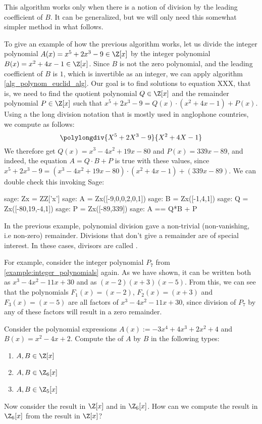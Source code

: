This algorithm works only when there is a notion of division by the leading coefficient of $B$. It can be generalized, but we will only need this somewhat simpler method in what follows.
\begin{example} To give an example of how the previous algorithm works, let us divide the integer polynomial $A(x)=x^5+2x^3-9\in \Z[x]$ by the integer polynomial $B(x)=x^2+4x-1\in\Z[x]$. Since $B$ is not the zero polynomial, and the leading coefficient of $B$ is $1$, which is invertible as an integer, we can apply algorithm \ref{alg_polynom_euclid_alg}. Our goal is to find solutions to equation XXX, that is, we need to find the quotient polynomial $Q\in\Z[x]$ and the remainder polynomial $P \in \Z[x]$ such that $x^5+2x^3-9 = Q(x)\cdot (x^2+4x-1) + P(x)$. Using a the long division notation that is mostly used in anglophone countries, we compute as follows:
\begin{equation}
\polylongdiv{X^5+2X^3-9}{X^2+4X-1}
\end{equation}
We therefore get $Q(x)=x^3-4x^2+19x-80$ and $P(x)=339x-89$, and indeed, the equation $ A=  Q \cdot B + P$ is true with these values, since $x^5+2x^3-9 = (x^3-4x^2+19x-80)\cdot (x^2+4x-1) + (339x-89)$. We can double check this invoking  Sage:
\begin{sagecommandline}
sage: Zx = ZZ['x']
sage: A = Zx([-9,0,0,2,0,1])
sage: B = Zx([-1,4,1])
sage: Q = Zx([-80,19,-4,1])
sage: P = Zx([-89,339])
sage: A == Q*B + P
\end{sagecommandline}
\end{example}
\begin{example} In the previous example, polynomial division gave a non-trivial (non-vanishing, i.e non-zero) remainder. Divisions that don't give a remainder are of special interest. In these cases, divisors are called .

For example, consider the integer polynomial $P_7$ from \examplename{} \ref{example:integer_polynomials} again. As we have shown, it can be written both as $x^3 - 4 x^2 - 11 x + 30$ and as $(x-2)(x + 3)(x-5)$. From this, we can see that the polynomials $F_1(x)=(x-2)$, $F_2(x)=(x+3)$ and $F_3(x)=(x-5)$ are all factors of $x^3 - 4 x^2 - 11 x + 30$, since division of $P_7$ by any of these factors will result in a zero remainder.
\end{example}
\begin{exercise} Consider the polynomial expressions $A(x):= -3x^4 + 4x^3 + 2x^2 +4$ and $B(x)= x^2-4x+2$. Compute the  of $A$ by $B$ in the following types:
\begin{enumerate}
\item $A,B\in \Z[x]$
\item $A,B\in \Z_6[x]$
\item $A,B\in \Z_5[x]$
\end{enumerate}
Now consider the result in $\Z[x]$ and in $\Z_6[x]$. How can we compute the result in $\Z_6[x]$ from the result in $\Z[x]$?
\end{exercise}
